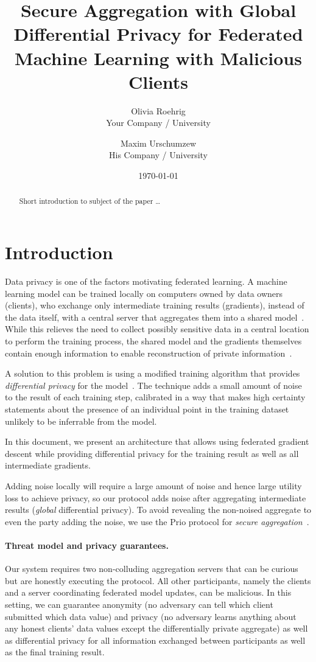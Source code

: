 \documentclass{article}
\title{Secure Aggregation with Global Differential Privacy for Federated Machine Learning with Malicious Clients}
\author{Olivia Roehrig  \\
	Your Company / University  \\
	\and
	Maxim Urschumzew \\
	His Company / University \\
	}
\date{\today}
\begin{document}
\maketitle


\begin{abstract}
Short introduction to subject of the paper \ldots 
\end{abstract}

\section{Introduction}
Data privacy is one of the factors motivating federated learning. A machine learning model can be trained locally on computers owned by data owners (clients), who exchange only intermediate training results (gradients), instead of the data itself, with a central server that aggregates them into a shared model~\cite{McMahan2016CommunicationEfficientLO}. While this relieves the need to collect possibly sensitive data in a central location to perform the training process, the shared model and the gradients themselves contain enough information to enable reconstruction of private information~\cite{7958568}\cite{Boenisch2021WhenTC}.

A solution to this problem is using a modified training algorithm that provides \emph{differential privacy} for the model~\cite{Abadi_2016}. The technique adds a small amount of noise to the result of each training step, calibrated in a way that makes high certainty statements about the presence of an individual point in the training dataset unlikely to be inferrable from the model.

In this document, we present an architecture that allows using federated gradient descent while providing differential privacy for the training result as well as all intermediate gradients.

Adding noise locally will require a large amount of noise and hence large utility loss to achieve privacy, so our protocol adds noise after aggregating intermediate results (\emph{global} differential privacy). To avoid revealing the non-noised aggregate to even the party adding the noise, we use the Prio protocol for \emph{secure aggregation}~\cite{prio}.

\paragraph{Threat model and privacy guarantees.}
Our system requires two non-colluding aggregation servers that can be curious but are honestly executing the protocol. All other participants, namely the clients and a server coordinating federated model updates, can be malicious. In this setting, we can guarantee anonymity (no adversary can tell which client submitted which data value) and privacy (no adversary learns anything about any honest clients' data values except the differentially private aggregate) as well as differential privacy for all information exchanged between participants as well as the final training result.
\end{document}
